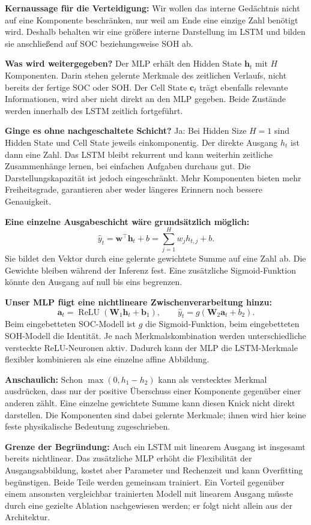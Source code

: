 \clearpage
{}
\textbf{Kernaussage für die Verteidigung:} Wir wollen das interne Gedächtnis nicht auf eine Komponente beschränken, nur weil am Ende eine einzige Zahl benötigt wird. Deshalb behalten wir eine größere interne Darstellung im LSTM und bilden sie anschließend auf SOC beziehungsweise SOH ab.

\textbf{Was wird weitergegeben?} Der MLP erhält den Hidden State $\mathbf h_t$ mit $H$ Komponenten. Darin stehen gelernte Merkmale des zeitlichen Verlaufs, nicht bereits der fertige SOC oder SOH. Der Cell State $\mathbf c_t$ trägt ebenfalls relevante Informationen, wird aber nicht direkt an den MLP gegeben. Beide Zustände werden innerhalb des LSTM zeitlich fortgeführt.

\textbf{Ginge es ohne nachgeschaltete Schicht?} Ja: Bei Hidden Size $H=1$ sind Hidden State und Cell State jeweils einkomponentig. Der direkte Ausgang $h_t$ ist dann eine Zahl. Das LSTM bleibt rekurrent und kann weiterhin zeitliche Zusammenhänge lernen, bei einfachen Aufgaben durchaus gut. Die Darstellungskapazität ist jedoch eingeschränkt. Mehr Komponenten bieten mehr Freiheitsgrade, garantieren aber weder längeres Erinnern noch bessere Genauigkeit.

\textbf{Eine einzelne Ausgabeschicht wäre grundsätzlich möglich:}
\[
\hat y_t=\mathbf w^\top\mathbf h_t+b
=\sum_{j=1}^{H}w_jh_{t,j}+b.
\]
Sie bildet den Vektor durch eine gelernte gewichtete Summe auf eine Zahl ab. Die Gewichte bleiben während der Inferenz fest. Eine zusätzliche Sigmoid-Funktion könnte den Ausgang auf null bis eins begrenzen.

\textbf{Unser MLP fügt eine nichtlineare Zwischenverarbeitung hinzu:}
\[
\mathbf a_t=\operatorname{ReLU}(\mathbf W_1\mathbf h_t+\mathbf b_1),
\qquad
\hat y_t=g(\mathbf W_2\mathbf a_t+b_2).
\]
Beim eingebetteten SOC-Modell ist $g$ die Sigmoid-Funktion, beim eingebetteten SOH-Modell die Identität. Je nach Merkmalskombination werden unterschiedliche versteckte ReLU-Neuronen aktiv. Dadurch kann der MLP die LSTM-Merkmale flexibler kombinieren als eine einzelne affine Abbildung.

\textbf{Anschaulich:} Schon $\max(0,h_1-h_2)$ kann als verstecktes Merkmal ausdrücken, dass nur der positive Überschuss einer Komponente gegenüber einer anderen zählt. Eine einzelne gewichtete Summe kann diesen Knick nicht direkt darstellen. Die Komponenten sind dabei gelernte Merkmale; ihnen wird hier keine feste physikalische Bedeutung zugeschrieben.

\textbf{Grenze der Begründung:} Auch ein LSTM mit linearem Ausgang ist insgesamt bereits nichtlinear. Das zusätzliche MLP erhöht die Flexibilität der Ausgangsabbildung, kostet aber Parameter und Rechenzeit und kann Overfitting begünstigen. Beide Teile werden gemeinsam trainiert. Ein Vorteil gegenüber einem ansonsten vergleichbar trainierten Modell mit linearem Ausgang müsste durch eine gezielte Ablation nachgewiesen werden; er folgt nicht allein aus der Architektur.
\clearpage
